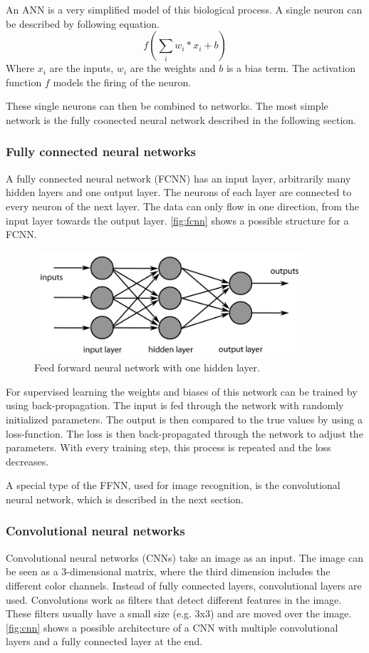\documentclass[12pt]{article}
\begin{document}
An ANN is a very simplified model of this biological process. A single neuron can be described by following equation. $$f\left(\sum_{i}w_i*x_i+b\right)$$ Where $x_i$ are the inputs, $w_i$ are the weights and $b$ is a bias term. The activation function $f$ models the firing of the neuron.

These single neurons can then be combined to networks. The most simple network is the fully coonected neural network described in the following section.

\subsubsection{Fully connected neural networks}
\label{subsubsec:fcnn}
A fully connected neural network (FCNN) has an input layer, arbitrarily many hidden layers and one output layer. The neurons of each layer are connected to every neuron of the next layer. The data  can only flow in one direction, from the input layer towards the output layer. \autoref{fig:fcnn} shows a possible structure for a FCNN.

\begin{figure}[ht]
\includegraphics[width=10cm]{ffnn}	
\caption{Feed forward neural network with one hidden layer.}
\label{fig:fcnn}
\end{figure}

For supervised learning the weights and biases of this network can be trained by using back-propagation. The input is fed through the network with randomly initialized parameters. The output is then compared to the true values by using a loss-function. The loss is then back-propagated through the network to adjust the parameters. With every training step, this process is repeated and the loss decreases.

A special type of the FFNN, used for image recognition, is the convolutional neural network, which is described in the next section.

\subsubsection{Convolutional neural networks}
\label{subsubsec:cnn}
Convolutional neural networks (CNNs) take an image as an input. The image can be seen as a 3-dimensional matrix, where the third dimension includes the different color channels. Instead of fully connected layers, convolutional layers are used. Convolutions work as filters that detect different features in the image. These filters usually have a small size (e.g. 3x3) and are moved over the image. \autoref{fig:cnn} shows a possible architecture of a CNN with multiple convolutional layers and a fully connected layer at the end.
\end{document}
